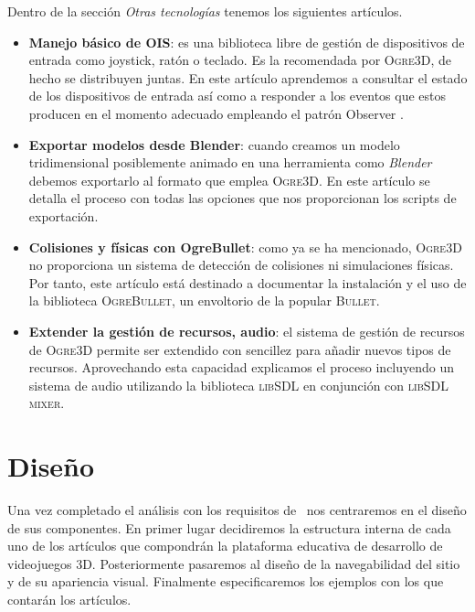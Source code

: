 Dentro de la sección \textit{Otras tecnologías} tenemos los siguientes
artículos.

\begin{itemize}
    \itemsep0em
    \item \textbf{Manejo básico de OIS}: es una biblioteca libre de gestión
    de dispositivos de entrada como joystick, ratón o teclado. Es la recomendada
    por \textsc{Ogre3D}, de hecho se distribuyen juntas. En este artículo
    aprendemos a consultar el estado de los dispositivos de entrada así como
    a responder a los eventos que estos producen en el momento adecuado empleando
    el patrón Observer \cite{gamm77}.
    \item \textbf{Exportar modelos desde Blender}: cuando creamos un modelo
    tridimensional posiblemente animado en una herramienta como \textit{Blender}
    debemos exportarlo al formato que emplea \textsc{Ogre3D}. En este artículo
    se detalla el proceso con todas las opciones que nos proporcionan los
    scripts de exportación.
    \item \textbf{Colisiones y físicas con OgreBullet}: como ya se ha mencionado,
    \textsc{Ogre3D} no proporciona un sistema de detección de colisiones ni
    simulaciones físicas. Por tanto, este artículo está destinado a documentar
    la instalación y el uso de la biblioteca \textsc{OgreBullet}, un envoltorio
    de la popular \textsc{Bullet}.
    \item \textbf{Extender la gestión de recursos, audio}: el sistema de gestión
    de recursos de \textsc{Ogre3D} permite ser extendido con sencillez para
    añadir nuevos tipos de recursos. Aprovechando esta capacidad explicamos
    el proceso incluyendo un sistema de audio utilizando la biblioteca
    \textsc{libSDL} en conjunción con \textsc{libSDL mixer}.
\end{itemize}



\section{Diseño}
\label{iberogre-diseno}

Una vez completado el análisis con los requisitos de \wiki\ nos centraremos
en el diseño de sus componentes. En primer lugar decidiremos la estructura
interna de cada uno de los artículos que compondrán la plataforma educativa
de desarrollo de videojuegos 3D. Posteriormente pasaremos al diseño de la
navegabilidad del sitio y de su apariencia visual. Finalmente especificaremos
los ejemplos con los que contarán los artículos.\\


